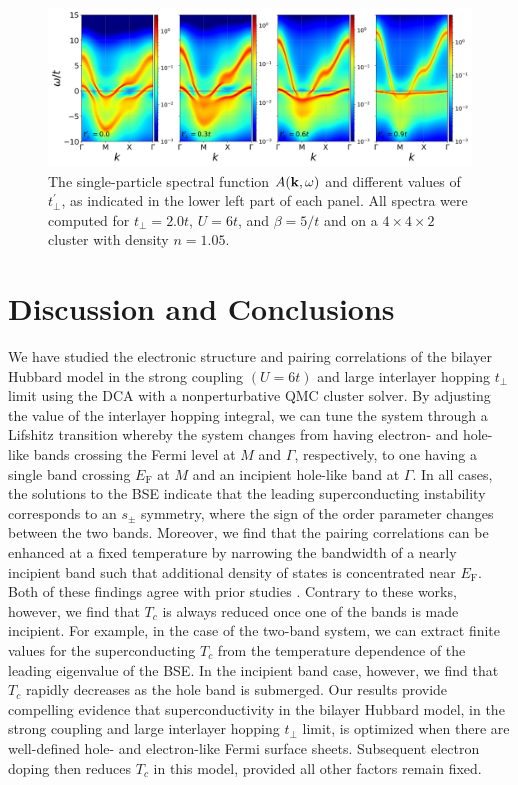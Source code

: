 \documentclass[prb,twocolumn,amsmath,amssymb,superscriptaddress,floatfix,nofootinbib]{revtex4-2}
\begin{document}
 
 
\begin{figure}
\centering
\includegraphics[width=\textwidth]{Akw_U6_n0pt95_bt5_tp2_tpp0_0pt3_0pt6_0pt9.png}
\caption{The single-particle spectral function $A({\bf k},\omega)$ and different values of $t_{\perp}^{\prime}$, as indicated in the lower left part of each panel. All spectra were computed for $t_{\perp}=2.0t$, $U=6t$, and $\beta=5/t$ and on a $4\times 4\times 2$ cluster with density $n=1.05$.}
\label{fig:Akwtperprime_n0.95}
\end{figure}


\section{Discussion and Conclusions}\label{sec:discussion} 
We have studied the electronic structure and pairing correlations of the bilayer Hubbard model in the strong coupling $(U = 6t)$ and large interlayer hopping $t_\perp$ limit using the DCA with a nonperturbative QMC cluster solver. By adjusting the value of the interlayer hopping integral, we can tune the system through a Lifshitz transition whereby the system changes from having electron- and hole-like bands crossing the Fermi level at $M$ and $\Gamma$, respectively, to one having a single band crossing $E_\mathrm{F}$ at $M$ and an incipient hole-like band at $\Gamma$. In all cases, the solutions to the BSE indicate that the leading superconducting instability corresponds to an $s_\pm$ symmetry, 
where the sign of the order parameter changes between the two bands. Moreover, we find that the pairing correlations can be enhanced at a fixed temperature by narrowing the bandwidth of a nearly incipient band such that additional density of states is concentrated near $E_\mathrm{F}$. Both of these findings agree with prior studies \cite{BangNJP2014, ChenPRB2015, Mishra2016, KurokiFlex2020, LinscheidPRL2016, RademakerEnhanced2021}. 
Contrary to these works, however, we find that $T_c$ is always reduced once one of the 
bands is made incipient.  For example, in the case of the two-band system, we can extract finite values for the superconducting $T_c$ from the temperature dependence of the leading eigenvalue of the BSE. In the incipient band case, however, we find that $T_c$ rapidly decreases as the hole band is submerged. Our results provide compelling evidence that superconductivity in the bilayer Hubbard model, in the strong coupling and large interlayer hopping $t_\perp$ limit, is optimized when there are well-defined hole- and electron-like Fermi surface sheets. Subsequent electron doping then reduces $T_c$ in this model, provided all other factors remain fixed. 
\end{document}
